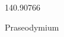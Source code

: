 \documentclass[12pt]{article}
\begin{document}
\hfill{}
\vfill
\begin{center}
  {\fontsize{50}{60}
  }

  140.90766

Praseodymium
\end{center}
\vfill
\end{document}
